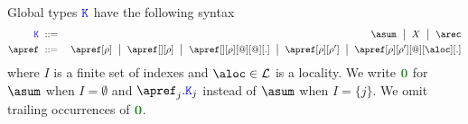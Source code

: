 Global types $\texttt{\textcolor{blue}K}$ have the following syntax
\begin{eqnarray*}
  \aK & \bnfdef & \asum \bnfmid
                  X \bnfmid
                  \arec
  \\
  \apref & \bnfdef & \apref[\arole] \bnfmid
                         \apref[{}][\arole] \bnfmid
                         \apref[{}][\arole][@][@][.] \bnfmid
                         \apref[\arole][\arole'] \bnfmid
                         \apref[\arole][\arole'][@][\aloc][.]
\end{eqnarray*}
where $I$ is a finite set of indexes and $\aloc \in \locset$ is a
locality.
%
We write $\nil$ for $\asum$ when $I = \emptyset$ and
$\apref_j.\aK_j$ instead of $\asum$ when $I = \{j\}$.
%
We omit trailing occurrences of $\nil$.
 

